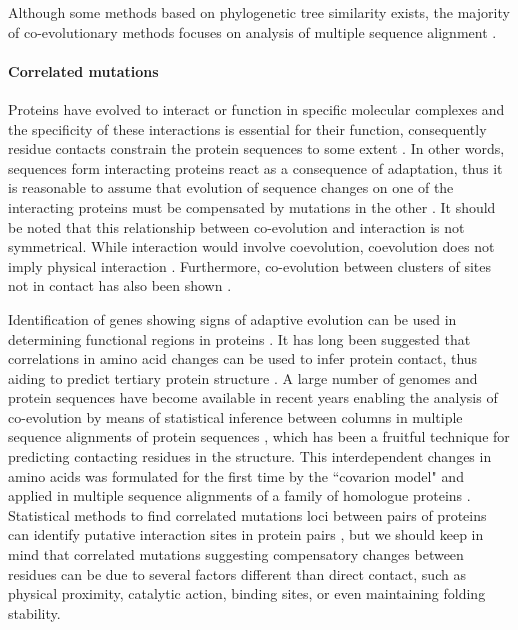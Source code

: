 Although some methods based on phylogenetic tree similarity exists, the majority of co-evolutionary methods focuses on analysis of multiple sequence alignment \cite{rohlfs2010detecting}.

\paragraph{Correlated mutations}
Proteins have evolved to interact or function in specific molecular complexes and the specificity of these interactions is essential for their function, consequently residue contacts constrain the protein sequences to some extent \cite{pazos1997correlated}.
In other words, sequences form interacting proteins react as a consequence of adaptation, thus it is reasonable to assume that evolution of sequence changes on one of the interacting proteins must be compensated by mutations in the other \cite{pazos1997correlated}.
It should be noted that this relationship between co-evolution and interaction is not symmetrical. 
While interaction would involve coevolution, coevolution does not imply physical interaction \cite{fares2006novel}.
Furthermore, co-evolution between clusters of sites not in contact has also been shown \cite{pritchard2000proteins}.

Identification of genes showing signs of adaptive evolution can be used in determining functional regions in proteins \cite{fares2006novel}.
It has long been suggested that correlations in amino acid changes can be used to infer protein contact, thus aiding to predict tertiary protein structure \cite{fitch1970improved, morcos2011direct, burger2010disentangling, de2013emerging}.
A large number of genomes and protein sequences have become available in recent years enabling the analysis of co-evolution by means of statistical inference between columns in multiple sequence alignments of protein sequences \cite{burger2010disentangling, burger2010disentangling}, which has been a fruitful technique for predicting contacting residues in the structure.
This interdependent changes in amino acids was formulated for the first time by the ``covarion model" \cite{fitch1970improved} and applied in multiple sequence alignments of a family of homologue proteins \cite{de2013emerging}.
Statistical methods to find correlated mutations loci between pairs of proteins can identify putative interaction sites in protein pairs \cite{de2013emerging}, but we should keep in mind that correlated mutations suggesting compensatory changes between residues can be due to several factors different than direct contact, such as physical proximity, catalytic action, binding sites, or even maintaining folding stability.

